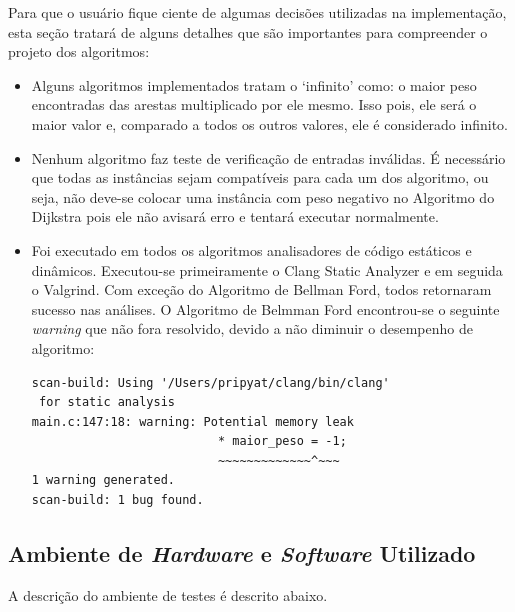 \documentclass[12pt]{article}
\begin{document}
Para que o usuário fique ciente de algumas decisões utilizadas na implementação, esta seção tratará de alguns detalhes que são importantes para compreender o projeto dos algoritmos:

\begin{itemize}
	\item Alguns algoritmos implementados tratam o `infinito' como: o maior peso encontradas das arestas multiplicado por ele mesmo. \newline
    	Isso pois, ele será o maior valor e, comparado a todos os outros valores, ele é considerado infinito.
        
    \item Nenhum algoritmo faz teste de verificação de entradas inválidas. \newline
    	É necessário que todas as instâncias sejam compatíveis para cada um dos algoritmo, ou seja, não deve-se colocar uma instância com peso negativo no Algoritmo do Dijkstra pois ele não avisará erro e tentará executar normalmente. 
        
    \item Foi executado em todos os algoritmos analisadores de código estáticos e dinâmicos. Executou-se primeiramente o Clang Static Analyzer e em seguida o Valgrind. Com exceção do Algoritmo de Bellman Ford, todos retornaram sucesso nas análises.\newline 
    O Algoritmo de Belmman Ford encontrou-se o seguinte \textit{warning} que não fora resolvido, devido a não diminuir o desempenho de algoritmo:
\begin{verbatim}
scan-build: Using '/Users/pripyat/clang/bin/clang'
 for static analysis
main.c:147:18: warning: Potential memory leak
                          * maior_peso = -1;
                          ~~~~~~~~~~~~~^~~~
1 warning generated.
scan-build: 1 bug found.
\end{verbatim}

        
       
\end{itemize}


\subsection{Ambiente de \textit{Hardware} e \textit{Software }Utilizado}

A descrição do ambiente de testes é descrito abaixo.
\end{document}

